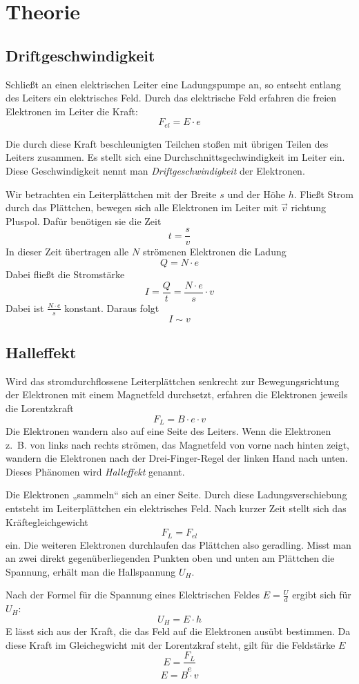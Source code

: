 \chapter{Theorie}
\section{Driftgeschwindigkeit}
Schließt an einen elektrischen Leiter eine Ladungspumpe an, so entseht entlang des Leiters ein elektrisches Feld. Durch das elektrische Feld erfahren die freien Elektronen im Leiter die Kraft:
$$F_{el} = E \cdot e$$

Die durch diese Kraft beschleunigten Teilchen stoßen mit übrigen Teilen des Leiters zusammen. Es stellt sich eine Durchschnittsgechwindigkeit im Leiter ein.
Diese Geschwindigkeit nennt man \emph{Driftgeschwindigkeit} der Elektronen.

Wir betrachten ein Leiterplättchen mit der Breite $s$ und der Höhe $h$.
Fließt Strom durch das Plättchen, bewegen sich alle Elektronen im Leiter mit $\vec{v}$ richtung Pluspol. Dafür benötigen sie die Zeit
$$t = \frac{s}{v}$$
In dieser Zeit übertragen alle $N$ strömenen Elektronen die Ladung 
$$Q = N \cdot e$$ 
Dabei fließt die Stromstärke
$$I = \frac{Q}{t} = \frac{N \cdot e}{s} \cdot v$$
Dabei ist $\frac{N \cdot e}{s}$ konstant. Daraus folgt
$$I \sim v$$

\section{Halleffekt}
Wird das stromdurchflossene Leiterplättchen senkrecht zur Bewegungsrichtung der Elektronen mit einem Magnetfeld durchsetzt, erfahren die Elektronen jeweils die Lorentzkraft
$$F_L = B \cdot e \cdot v$$
Die Elektronen wandern also auf eine Seite des Leiters. Wenn die Elektronen z.~B. von links nach rechts strömen, das Magnetfeld von vorne nach hinten zeigt, wandern die Elektronen nach der Drei-Finger-Regel der linken Hand nach unten. Dieses Phänomen wird \emph{Halleffekt} genannt.

Die Elektronen „sammeln“ sich an einer Seite. Durch diese Ladungsverschiebung entsteht im Leiterplättchen ein elektrisches Feld. Nach kurzer Zeit stellt sich das Kräftegleichgewicht
$$F_L = F_{el}$$
ein. Die weiteren Elektronen durchlaufen das Plättchen also geradling.
Misst man an zwei direkt gegenüberliegenden Punkten oben und unten am Plättchen die Spannung, erhält man die Hallspannung $U_H$.

Nach der Formel für die Spannung eines Elektrischen Feldes $E = \frac{U}{d}$ ergibt sich für $U_H$:
$$U_H = E \cdot h$$
E lässt sich aus der Kraft, die das Feld auf die Elektronen ausübt bestimmen. Da diese Kraft im Gleichegwicht mit der Lorentzkraf steht, gilt für die Feldstärke $E$
$$E = \frac{F_L}{e}$$
$$E = B \cdot v$$

